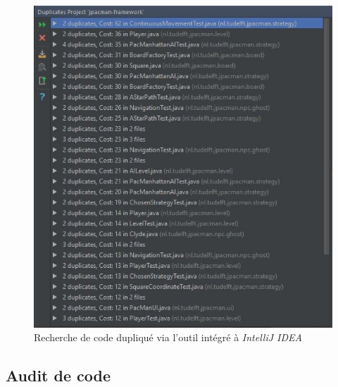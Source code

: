 \documentclass[12pt, openany]{report}
\begin{document}
\begin{figure}[h]
	\centering
	\includegraphics{Images/duplicate_analysis.JPG}
	\caption{\label{duplicate} Recherche de code dupliqué via l'outil intégré à \textit{IntelliJ IDEA}}
\end{figure}

\subsection{Audit de code}
\end{document}
